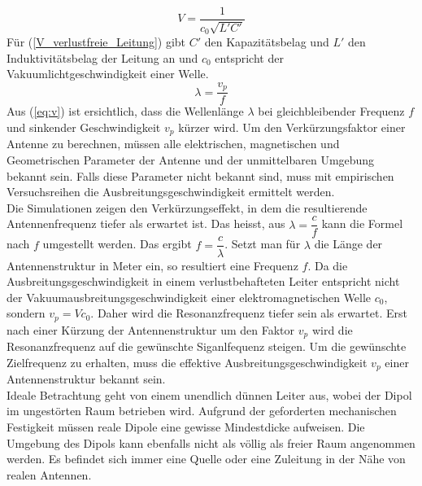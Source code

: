 \begin{equation}\label{V_verlustfreie_Leitung}
V=\dfrac{1}{c_0 \sqrt{L'C'}} 
\end{equation}
Für (\ref{V_verlustfreie_Leitung}) gibt $C'$ den Kapazitätsbelag und $L'$ den Induktivitätsbelag der Leitung an und $c_0$ entspricht der Vakuumlichtgeschwindigkeit einer Welle.
\begin{equation}\label{eq:v}
\lambda=\dfrac{v_p}{f}
\end{equation} 
Aus (\ref{eq:v}) ist ersichtlich, dass die Wellenlänge $\lambda$ bei gleichbleibender Frequenz $f$ und sinkender Geschwindigkeit $v_p$ kürzer wird. 
Um den Verkürzungsfaktor einer Antenne zu berechnen, müssen alle elektrischen, magnetischen und Geometrischen Parameter der Antenne und der unmittelbaren Umgebung bekannt sein. Falls diese Parameter nicht bekannt sind, muss mit empirischen Versuchsreihen die Ausbreitungsgeschwindigkeit ermittelt werden.\\

\newpage
Die Simulationen zeigen den Verkürzungseffekt, in dem die resultierende Antennenfrequenz tiefer als erwartet ist. Das heisst, aus $\lambda = \dfrac{c}{f}$ kann die Formel nach $f$ umgestellt werden. Das ergibt $f=\dfrac{c}{\lambda}$. Setzt man für $\lambda$ die Länge der Antennenstruktur in Meter ein, so resultiert eine Frequenz $f$. Da die Ausbreitungsgeschwindigkeit in einem verlustbehafteten Leiter entspricht nicht der Vakuumausbreitungsgeschwindigkeit einer elektromagnetischen Welle $c_0$, sondern $v_p=V c_0$. Daher wird die Resonanzfrequenz tiefer sein als erwartet. Erst nach einer Kürzung der Antennenstruktur um den Faktor $v_p$ wird die Resonanzfrequenz auf die gewünschte Siganlfequenz steigen. Um die gewünschte Zielfrequenz zu erhalten, muss die effektive Ausbreitungsgeschwindigkeit $v_p$ einer Antennenstruktur bekannt sein.\\

Ideale Betrachtung geht von einem unendlich dünnen Leiter aus, wobei der Dipol im ungestörten Raum betrieben wird. Aufgrund der geforderten mechanischen Festigkeit müssen reale Dipole eine gewisse Mindestdicke aufweisen. Die Umgebung des Dipols kann ebenfalls nicht als völlig als freier Raum angenommen werden. Es befindet sich immer eine Quelle oder eine Zuleitung in der Nähe von realen Antennen. \\

